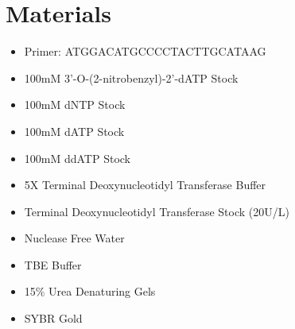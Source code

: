 \documentclass[letterpaper]{article}
\newcommand{\tdt}{Terminal Deoxynucleotidyl Transferase}
\newcommand{\uL}{\micro{}L}
\newcommand{\BdATP}{3'-O-(2-nitrobenzyl)-2'-dATP}
\begin{document}
\section{Materials}
\begin{itemize}
\item{Primer: ATGGACATGCCCCTACTTGCATAAG}
\item{100mM \BdATP{} Stock}
\item{100mM dNTP Stock}
\item{100mM dATP Stock}
\item{100mM ddATP Stock}
\item{5X \tdt{} Buffer}
\item{\tdt{} Stock (20U/\uL{})}
\item{Nuclease Free Water}
\item{TBE Buffer}
\item{15\% Urea Denaturing Gels}
\item{SYBR Gold}
\end{itemize}
\end{document}
